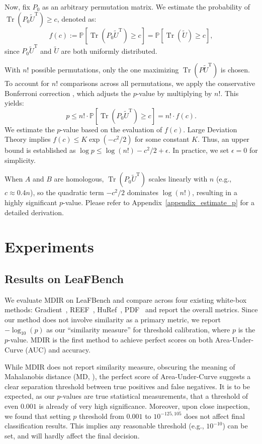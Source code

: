 \documentclass{article} %
\DeclareMathOperator{\Tr}{Tr}
\begin{document}
Now, fix $P_0$ as an arbitrary permutation matrix. We estimate the probability of $\Tr(P_0 \tilde{U}^{\text{T}}) \geq c$, denoted as:
\[
f(c) := \mathbb{P}\left[\Tr(P_0 \tilde{U}^{\text{T}}) \geq c\right] = \mathbb{P}\left[\Tr(\tilde{U}) \geq c\right],
\] 
since $P_0 \tilde{U}^{\text{T}}$ and $\tilde{U}$ are both uniformly distributed. 

With $n!$ possible permutations, only the one maximizing $\Tr(P \tilde{U}^{\text{T}})$ is chosen. To account for $n!$ comparisons across all permutations, we apply the conservative Bonferroni correction \citep{bonferroni_mathworld}, which adjusts the $p$-value by multiplying by $n!$. This yields:
\[
p \le n! \cdot \mathbb{P}\left[ \Tr(P_0 \tilde{U}^{\text{T}}) \ge c \right] = n! \cdot f(c).
\]
We estimate the $p$-value based on the evaluation of $f(c)$. Large Deviation Theory implies $f(c) \le K\exp(-c^2/2)$ for some constant $K$. Thus, an upper bound is established as
$ \log p \le \log (n!) - c^2 / 2 + \epsilon $. In practice, we set $\epsilon = 0$ for simplicity.

When $A$ and $B$ are homologous, $\Tr(P_0 \tilde{U}^{\text{T}})$ scales linearly with $n$ (e.g., $c \approx 0.4n$), so the quadratic term $-c^2/2$ dominates $\log(n!)$, resulting in a highly significant $p$-value.
Please refer to Appendix~\ref{appendix_estimate_p} for a detailed derivation.

\section{Experiments}
\subsection{Results on LeaFBench}
We evaluate MDIR on LeaFBench \citep{shao2025soklargelanguagemodel} and compare across four existing white-box methods: Gradient~\citep{wu2025gradientbasedmodelfingerprintingllm},  REEF~\citep{zhang2025reef}, HuRef~\citep{zeng2024huref}, PDF~\citep{yoon2025intrinsicfingerprintllmscontinue} and report the overall metrics. Since our method does not involve similarity as a primary metric, we report $-\log_{10}(p)$ as our ``similarity measure'' for threshold calibration, where $p$ is the $p$-value. MDIR is the first method to achieve perfect scores on both Area-Under-Curve (AUC) and accuracy.

While MDIR does not report similarity measure, obscuring the meaning of Mahalanobis distance (MD, \citet{DEMAESSCHALCK20001}), the perfect score of Area-Under-Curve suggests a clear separation threshold between true positives and false negatives. It is to be expected, as our $p$-values are true statistical measurements, that a threshold of even $0.001$ is already of very high significance. Moreover, upon close inspection, we found that setting $p$ threshold from $0.001$ to $10^{-125,105}$ does not affect final classification results. This implies any reasonable threshold (e.g., $10^{-10}$) can be set, and will hardly affect the final decision. 
\end{document}

